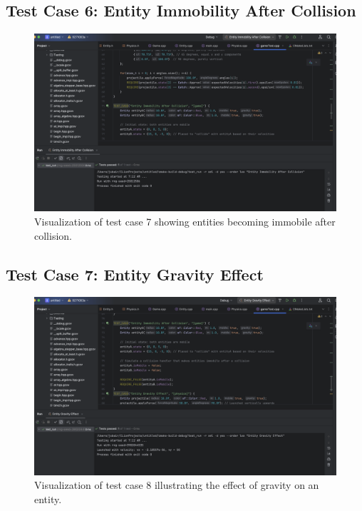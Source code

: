 \documentclass[12pt]{article}
\begin{document}
\subsection{Test Case 6: Entity Immobility After Collision}

\begin{figure}[h!]
    \centering
    \includegraphics[width=\linewidth]{t7.png} 
    \caption{Visualization of test case 7 showing entities becoming immobile after collision.}
    \label{fig:test_case_7}
\end{figure}
\FloatBarrier
\subsection{Test Case 7: Entity Gravity Effect}

\begin{figure}[h!]
    \centering
    \includegraphics[width=\linewidth]{t8.png} 
    \caption{Visualization of test case 8 illustrating the effect of gravity on an entity.}
    \label{fig:test_case_8}
\end{figure}
\end{document}
